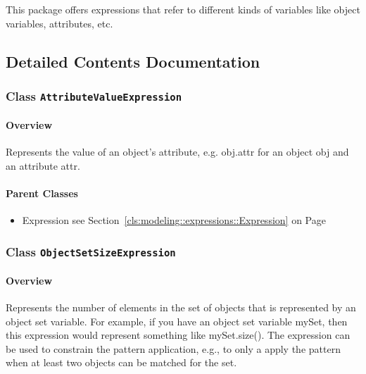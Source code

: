 			
This package offers expressions that refer to different kinds of variables like object variables, attributes, etc.	
		
	
			
		



\subsection{Detailed Contents Documentation}
\subsubsection{\Large{Class \bfseries \texttt{AttributeValueExpression}\normalfont}}
\label{cls:modeling::patterns::expressions::AttributeValueExpression} 
\paragraph{Overview}

	
			
Represents the value of an object's attribute, e.g. obj.attr for an object obj and an attribute attr.	
		
	



\paragraph{Parent Classes}
\begin{itemize}
\item Expression see Section~\ref{cls:modeling::expressions::Expression} on Page~\pageref{cls:modeling::expressions::Expression}\end{itemize}
\subsubsection{\Large{Class \bfseries \texttt{ObjectSetSizeExpression}\normalfont}}
\label{cls:modeling::patterns::expressions::ObjectSetSizeExpression} 
\paragraph{Overview}

	
			
Represents the number of elements in the set of objects that is represented by an object set variable. For example, if you have an object set variable mySet, then this expression would represent something like mySet.size(). The expression can be used to constrain the pattern application, e.g., to only a apply the pattern when at least two objects can be matched for the set.	
		
